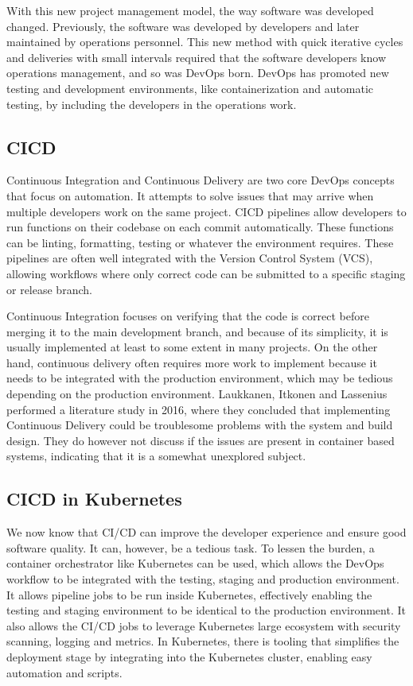 With this new project management model, the way software was developed changed. Previously, the software was developed by developers and later maintained by operations personnel. This new method with quick iterative cycles and deliveries with small intervals required that the software developers know operations management, and so was DevOps born. DevOps has promoted new testing and development environments, like containerization and automatic testing, by including the developers in the operations work.

\subsection{CICD}
Continuous Integration and Continuous Delivery are two core DevOps concepts\cite{redhat_cicd} that focus on automation. It attempts to solve issues that may arrive when multiple developers work on the same project. CICD pipelines allow developers to run functions on their codebase on each commit automatically. These functions can be linting, formatting, testing or whatever the environment requires. These pipelines are often well integrated with the Version Control System (VCS), allowing workflows where only correct code can be submitted to a specific staging or release branch. 

Continuous Integration focuses on verifying that the code is correct before merging it to the main development branch, and because of its simplicity, it is usually implemented at least to some extent in many projects. On the other hand, continuous delivery often requires more work to implement because it needs to be integrated with the production environment, which may be tedious depending on the production environment. Laukkanen, Itkonen and Lassenius\cite{cd_problems} performed a literature study in 2016, where they concluded that implementing Continuous Delivery could be troublesome problems with the system and build design. They do however not discuss if the issues are present in container based systems, indicating that it is a somewhat unexplored subject. 

\subsection{CICD in Kubernetes}
We now know that CI/CD can improve the developer experience and ensure good software quality. It can, however, be a tedious task. To lessen the burden, a container orchestrator like Kubernetes can be used, which allows the DevOps workflow to be integrated with the testing, staging and production environment. It allows pipeline jobs to be run inside Kubernetes, effectively enabling the testing and staging environment to be identical to the production environment. It also allows the CI/CD jobs to leverage Kubernetes large ecosystem with security scanning, logging and metrics. In Kubernetes, there is tooling that simplifies the deployment stage by integrating into the Kubernetes cluster, enabling easy automation and scripts.

